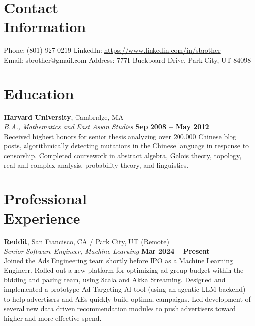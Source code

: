 \documentclass[margin,line]{resume}
\begin{document}
\begin{resume}
    \section{\mysidestyle Contact\\Information}

    Phone: (801) 927-0219       \hfill LinkedIn: \url{https://www.linkedin.com/in/sbrother} \\
    \noindent Email: sbrother@gmail.com  \hfill Address: 7771 Buckboard Drive, Park City, UT 84098 \vspace{0mm}\\\vspace{-4.5mm}

    \section{\mysidestyle Education}

    \textbf{Harvard University}, Cambridge, MA \vspace{2mm}\\\vspace{1mm}%
    \textsl{B.A., Mathematics and East Asian Studies} \hfill \textbf{Sep 2008 -- May 2012}\\
    Received highest honors for senior thesis analyzing over 200,000 Chinese
    blog posts, algorithmically detecting mutations in the Chinese language in
    response to censorship. Completed coursework in abstract algebra,
    Galois theory, topology, real and complex analysis, probability theory, and
    linguistics.

    \section{\mysidestyle Professional\\Experience}

    \textbf{Reddit}, San Francisco, CA / Park City, UT (Remote)  \vspace{2mm}\\\vspace{1mm}%
    \textsl{Senior Software Engineer, Machine Learning} \hfill \textbf{Mar 2024 -- Present}\\
    Joined the Ads Engineering team shortly before IPO as a Machine Learning Engineer.
    Rolled out a new platform for optimizing ad group budget within the bidding
    and pacing team, using Scala and Akka Streaming. Designed and implemented a
    prototype Ad Targeting AI tool (using an agentic LLM backend) to help
    advertisers and AEs quickly build optimal campaigns. Led development of
    several new data driven recommendation modules to push advertisers toward
    higher and more effective spend.


\end{resume}
\end{document}
